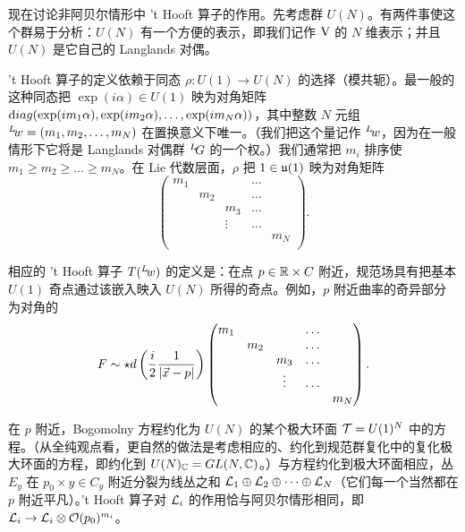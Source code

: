 \par{}

现在讨论非阿贝尔情形中 't Hooft 算子的作用。先考虑群 $U(N)$。有两件事使这个群易于分析：$U(N)$ 有一个方便的表示，即我们记作 $\VV$ 的 $N$ 维表示；并且 $U(N)$ 是它自己的 Langlands 对偶。

't Hooft 算子的定义依赖于同态 $\rho:U(1)\to U(N)$ 的选择（模共轭）。最一般的这种同态把 $\exp({i\alpha})\in U(1)$ 映为对角矩阵 ${\rm
diag}(\exp({im_1\alpha}),\exp({im_2\alpha}),\dots,
\exp({im_N\alpha}))$，其中整数 $N$ 元组
$^L\negthinspace w=(m_1,m_2,\dots,m_N)$ 在置换意义下唯一。（我们把这个量记作 $^L\negthinspace w$，因为在一般情形下它将是 Langlands 对偶群 $^L\negthinspace G$ 的一个权。）我们通常把 $m_i$ 排序使 $m_1\geq
m_2\geq \dots\geq m_N$。在 Lie 代数层面，$\rho$ 把 $1\in \frak{u}(1)$ 映为对角矩阵
\setcounter{equation}{10}
\begin{equation}\label{eq:morphy}
\left(\begin{matrix}m_1& & & \dots & \\
                                    &m_2& & \dots & \\
                          & & m_3 &\dots & \\
                & & \vdots & \dots& \\
            & & & & m_N\\\end{matrix}\right).
\end{equation}

相应的 't Hooft 算子 $T(^L\negthinspace w)$ 的定义是：在点 $p\in  \Bbb{R}\times C$ 附近，规范场具有把基本 $U(1)$ 奇点通过该嵌入映入 $U(N)$ 所得的奇点。例如，$p$ 附近曲率的奇异部分为对角的
\setcounter{equation}{11}
\begin{equation}\label{eq:orphy}
F\sim \star d\left({i\over 2}{1\over |\vec x -
p|}\right) \left(\begin{matrix}m_1& & & \dots & \\
                                    & m_2& & \dots & \\
                          & & m_3 &\dots & \\
                & & \vdots & \dots& \\
            & & & & m_N\\\end{matrix}\right).
\end{equation}

在 $p$ 附近，Bogomolny 方程约化为 $U(N)$ 的某个极大环面 ${\cal T}=U(1)^N$ 中的方程。（从全纯观点看，更自然的做法是考虑相应的、约化到规范群复化中的复化极大环面的方程，即约化到 $U(N)_{\Bbb{C}}=GL(N,\Bbb{C})$。）与方程约化到极大环面相应，丛 $E_y$ 在 $p_0\times y \in C_y$ 附近分裂为线丛之和 ${\cal L}_1\oplus {\cal L}_2\oplus\dots \oplus {\cal L}_N$（它们每一个当然都在 $p$ 附近平凡）。't Hooft 算子对 ${\cal L}_i$ 的作用恰与阿贝尔情形相同，即 ${\cal L}_i\to {\cal L}_i\otimes {\cal O}(p_0)^{m_i}$。

